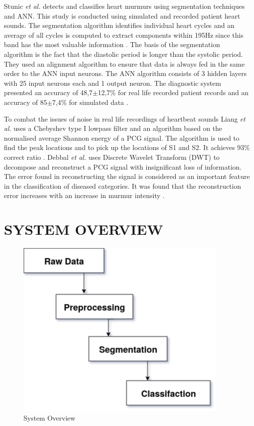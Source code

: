 \documentclass[10pt,twocolumn]{witseiepaper}
\begin{document}
Stunic \textit{et al.} detects and classifies heart murmurs using segmentation techniques and ANN. This study is conducted using simulated and recorded patient heart sounds. The segmentation algorithm identifies individual heart cycles and an average of all cycles is computed to extract components within 195Hz since this band has the most valuable information \cite{strunic}. The basis of the segmentation algorithm is the fact that the diastolic period is longer than the systolic period. They used an alignment algorithm to ensure that data is always fed in the same order to the ANN input neurons. The ANN algorithm consists of 3 hidden layers with 25 input neurons each and 1 output neuron. The diagnostic system presented an accuracy of 48,7$\pm$12,7\% for real life recorded patient records and an accuracy of 85$\pm$7,4\% for simulated data \cite{strunic}.

To combat the issues of noise in real life recordings of heartbeat sounds Liang \textit{et al.} uses a Chebyshev type I lowpass filter and an algorithm  based on the normalised average Shannon energy of a PCG signal. The algorithm is used to find the peak locations and to pick up the locations of S1 and S2. It achieves 93\% correct ratio \cite{liang1997heart}. Debbal \textit{et al.} uses Discrete Wavelet Transform (DWT) to decompose and reconstruct a PCG signal with insignificant loss of information. The error found in reconstructing the signal is considered as an important feature in the classification of diseased categories. It was found that the reconstruction error increases with an increase in murmur intensity \cite{debbal}.



\section{SYSTEM OVERVIEW}

\begin{figure}[h!]
    \centering
    \includegraphics[scale = 0.52]{systemOverviw.png}
    \caption{System Overview}
    \label{fig:sysov}
\end{figure}{}
\end{document}
